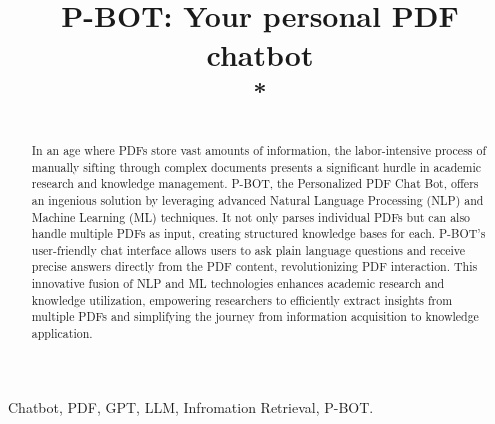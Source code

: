 \documentclass[conference]{IEEEtran}
\begin{document}
\title{P-BOT: Your personal PDF chatbot\\
{\footnotesize \textsuperscript{*}}
}

\author{
\and
{}
\and
{}
\and
{}
}

\maketitle

\begin{abstract}
In an age where PDFs store vast amounts of information, the labor-intensive process of manually sifting through complex documents presents a significant hurdle in academic research and knowledge management. P-BOT, the Personalized PDF Chat Bot, offers an ingenious solution by leveraging advanced Natural Language Processing (NLP) and Machine Learning (ML) techniques. It not only parses individual PDFs but can also handle multiple PDFs as input, creating structured knowledge bases for each. P-BOT's user-friendly chat interface allows users to ask plain language questions and receive precise answers directly from the PDF content, revolutionizing PDF interaction. This innovative fusion of NLP and ML technologies enhances academic research and knowledge utilization, empowering researchers to efficiently extract insights from multiple PDFs and simplifying the journey from information acquisition to knowledge application.
\end{abstract}
\baselineskip
\begin{IEEEkeywords}
Chatbot, PDF, GPT, LLM, Infromation Retrieval, P-BOT.
\end{IEEEkeywords}
\end{document}
